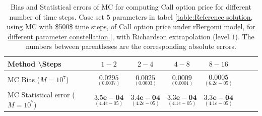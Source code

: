 \documentclass[11pt]{article}
\begin{document}
\begin{table}[h!]
	\centering
	\begin{tabular}{l*{6}{c}r}
		Method \textbackslash  Steps            & $1-2$ & $2-4$ & $4-8$ & $8-16$  \\
		\hline
		MC Bias ($M=10^7$)  &$\underset{(  0.0037
			)}{\mathbf{0.0295}}$  & $\underset{( 0.0003)}{\mathbf{0.0025}}$  & $\underset{(   0.0001)}{\mathbf{0.0009}}$  & $\underset{(  6.2e-05)}{\mathbf{0.0005}}$ \\	
		
		MC Statistical error ($M=10^7$)   & $\underset{(  4.4e-05)}{\mathbf{3.5e-04}}$  & $\underset{(   4.2e-05)}{\mathbf{3.4e-04}}$  & $\underset{(  4.1e-05)}{\mathbf{3.3e-04}}$ & $\underset{(  4.1e-05)}{\mathbf{3.3e-04}}$ \\	
		
		
		
		
		
		\hline
	\end{tabular}
	\caption{Bias and Statistical errors of MC   for computing Call option price  for different number of time steps. Case set $5$ parameters in tabel \ref{table:Reference solution, using MC with $500$ time steps, of Call option price under rBergomi model, for different parameter constellation.}, with Richardson extrapolation (level $1$). The numbers between parentheses are the corresponding absolute errors.}
	\label{Bias and Statistical errors of MC ($M=10^7$)  for computing Call option price  for different number of time steps. Case set $5$ parameters, with Richardson extrapolation (level1). The numbers between parentheses are the corresponding absolute errors.}
\end{table}
\end{document}
